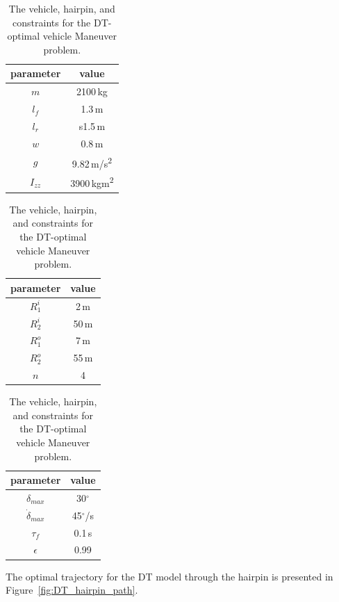 \begin{table}[h!]
    \begin{subtable}{0.3\textwidth}
        \begin{tabular}{c|c}
            parameter & value\\
            \hline
            $m$ & 2100\,kg\\
            $l_f$ & 1.3\,m \\     
            $l_r$ & s1.5\,m \\
            $w$ & 0.8\,m\\
            $g$ & 9.82\,m/s\textsuperscript{2}\\
            $I_{zz}$ & 3900\,kgm\textsuperscript{2}\\
        \end{tabular}
        \caption{Vehicle parameters}
    \end{subtable}
    \hfill
    \begin{subtable}{0.3\textwidth}
        \begin{tabular}{c|c}
            parameter & value\\
            \hline
            $R_1^i$ & 2\,m \\
            $R_2^i$ & 50\,m \\
            $R_1^o$ & 7\,m \\
            $R_2^o$ & 55\,m \\
            $n$ & 4
        \end{tabular}
        \caption{Hairpin parameters}
    \end{subtable}
    \hfill
    \begin{subtable}{0.3\textwidth}
        \begin{tabular}{c|c}
            parameter & value\\
            \hline
            $\delta_{max}$ & 30$^\circ$ \\
            $\dot\delta_{max}$ & 45$^\circ$/s \\
            $\tau_f$ & 0.1\,s\\
            $\epsilon$ & 0.99\\
        \end{tabular}
        \caption{Constrains}
    \end{subtable}
    \caption{The vehicle, hairpin, and constraints for the DT-optimal vehicle Maneuver problem.}
    \label{tab:ocp_prob2}
\end{table}

The optimal trajectory for the DT model through the hairpin is presented in Figure~\ref{fig:DT_hairpin_path}. 

